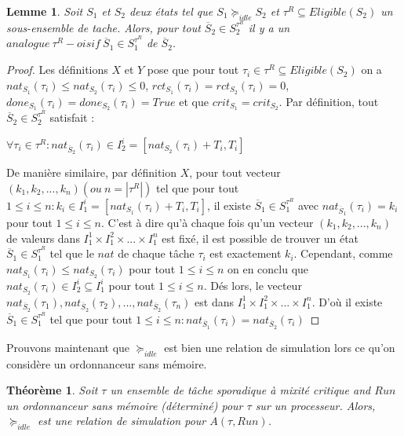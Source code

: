 \documentclass[a4paper]{report}
\theoremstyle{break}
\theoremstyle{breakplain}
\newtheorem{theo}{Théorème}
\newtheorem{lem}{Lemme}
\begin{document}
\begin{lem}
\label{reqanalogueeq}
Soit $S_1$ et $S_2$ deux états tel que $S_1 \succeq_{idle} S_2$ et $\tau^R \subseteq Eligible(S_2)$ un sous-ensemble de tache. Alors, pour tout $\overline{S}_2 \in S_2^{\tau^R}$ il y a un $analogue\ \tau^R-oisif\ \overline{S}_1 \in S_1^{\tau^R}$ de $\overline{S}_2$.
\end{lem}
\begin{proof}
Les définitions $X$ et $Y$ pose que pour tout $\tau_i \in \tau^R \subseteq Eligible(S_2)$ on a $nat_{S_1}(\tau_i) \leq nat_{S_2}(\tau_i) \leq 0$, $rct_{S_1}(\tau_i) = rct_{S_2}(\tau_i) = 0$, $done_{S_1}(\tau_i) = done_{S_2}(\tau_i) = True$ et que $crit_{S_1} = crit_{S_2}$. Par définition, tout $\overline{S}_2 \in S^{\tau^R}_2$ satisfait :
\begin{center}
$\forall \tau_i \in \tau^R : nat_{\overline{S}_2}(\tau_i) \in I^i_2=[nat_{S_2}(\tau_i)+T_i, T_i] $
\end{center}
De manière similaire, par définition $X$, pour tout vecteur $(k_1, k_2, ..., k_n)(ou\ n = |\tau^R|)$ tel que pour tout $1\leq i \leq n: k_i \in I^i_1=[nat_{S_1}(\tau_i)+T_i, T_i]$, il existe $\overline{S}_1\in S^{\tau^R}_1$ avec $nat_{\overline{S}_1}(\tau_i) = k_i$ pour tout $1\leq i \leq n$. C'est à dire qu'à chaque fois qu'un vecteur $(k_1, k_2, ..., k_n)$ de valeurs dans $I_1^1 \times I_1^2 \times ... \times I_1^n$ est fixé, il est possible de trouver un état $\overline{S}_1 \in S^{\tau^R}_1$ tel que le $nat$ de chaque tâche $\tau_i$ est exactement $k_i$. Cependant, comme $nat_{S_1}(\tau_i) \leq nat_{S_2}(\tau_i)$ pour tout $1\leq i \leq n$ on en conclu que $nat_{S_2}(\tau_i) \in I^i_2 \subseteq I^i_1$ pour tout $1\leq i \leq n$. Dés lors, le vecteur $nat_{\overline{S}_2}(\tau_1), nat_{\overline{S}_2}(\tau_2), ..., nat_{\overline{S}_2}(\tau_n)$ est dans $I_1^1 \times I_1^2 \times ... \times I_1^n$. D'où il existe $\overline{S}_1 \in S^{\tau^R}_1$ tel que pour tout $1\leq i \leq n : nat_{\overline{S}_1}(\tau_i) = nat_{\overline{S}_2}(\tau_i)$
\end{proof}


Prouvons maintenant que $\succeq_{idle}$ est bien une relation de simulation lors ce qu'on considère un ordonnanceur sans mémoire.

\begin{theo}
Soit $\tau$ un ensemble de tâche sporadique à mixité critique and $Run$ un ordonnanceur sans mémoire (déterminé) pour $\tau$ sur un processeur. Alors, $\succeq_{idle}$ est une relation de simulation pour $A(\tau, Run)$.
\end{theo}
\end{document}
